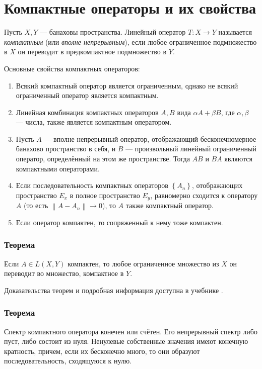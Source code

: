 \section{Компактные операторы и их свойства}
\label{sec:q-38}
Пусть $X, Y$ --- банаховы пространства. Линейный оператор $T: X \rightarrow Y$ называется \textit{компактным} (или \textit{вполне непрерывным}), если любое ограниченное подмножество в $X$ он переводит в предкомпактное подмножество в $Y$.

Основные свойства компактных операторов:
\begin{enumerate}
	\itemsep0pt
	\item Всякий компактный оператор является ограниченным, однако не всякий ограниченный оператор является компактным.
	\item Линейная комбинация компактных операторов $A, B$ вида $\alpha A + \beta B$, где $\alpha, \beta$ --- числа, также является компактным оператором.
	\item Пусть $A$ --- вполне непрерывный оператор, отображающий бесконечномерное банахово пространство в себя, и $B$ --- произвольный линейный ограниченный оператор, определённый на этом же пространстве. Тогда $AB$ и $BA$ являются компактными операторами.
	\item Если последовательность компактных операторов $\left \{ A_{n} \right \}$, отображающих пространство $E_{x}$ в полное пространство $E_{y}$, равномерно сходится к оператору $A$ (то есть $\left \| A - A_{n} \right \|  \to 0$), то $A$ также компактный оператор.
	\item Если оператор компактен, то сопряженный к нему тоже компактен.
\end{enumerate}

\subsubsection*{Теорема}
Если $A \in L(X, Y)$ компактен, то любое ограниченное множество из $X$ он переводит во множество, компактное в $Y$.

Доказательства теорем и подробная информация доступна в учебнике \cite[с.~203]{trenogin}.

\subsubsection*{Теорема}
Спектр компактного оператора конечен или счётен. Его непрерывный спектр либо пуст, либо состоит из нуля. Ненулевые собственные значения имеют конечную кратность, причем, если их бесконечно много, то они образуют последовательность, сходящуюся к нулю.


